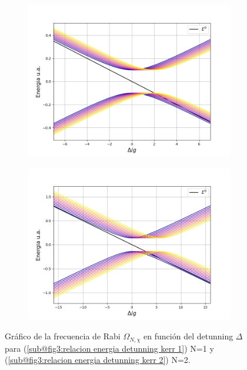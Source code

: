 \begin{figure}[H]
    \centering
    \begin{subfigure}[h]{0.49\textwidth}
        \centering
        \includegraphics[width=\textwidth]{figuras/ch3/relacion energia detunning jcm simple kerr.png}
        \caption{}
        \label{fig3:relacion energia detunning kerr 1}
    \end{subfigure}
    \hfill
    \begin{subfigure}[h]{0.49\textwidth}
        \centering
        \includegraphics[width=\textwidth]{figuras/ch3/relacion energia detunning jcm simple kerr 2.png}
        \caption{}
        \label{fig3:relacion energia detunning kerr 2}
    \end{subfigure}
    \caption{Gráfico de la frecuencia de Rabi $\Omega_{N,\chi}$ en función del detunning $\Delta$ para (\ref{sub@fig3:relacion energia detunning kerr 1}) N=1 y (\ref{sub@fig3:relacion energia detunning kerr 2}) N=2.}
    \label{fig3:relacion energia detunning kerr}
\end{figure}

